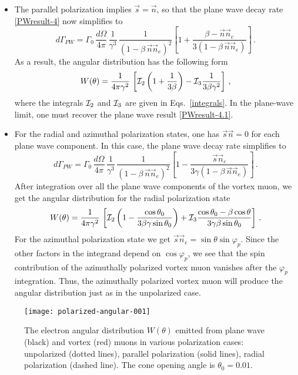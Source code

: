\documentclass[aps,prd,longbibliography,nofootinbib,amsthm,amsmath,amssymb,amsfonts,notitlepage]{revtex4-1}
\begin{document}
\begin{itemize}
	\item
	The parallel polarization implies $\vec s = \vec n$, so that the plane wave decay rate \eqref{PWresult-4} now simplifies to
	\begin{equation}
	d\Gamma_{PW} = \Gamma_0\, \frac{d\Omega}{4\pi} \, \frac{1}{\gamma^3}\, \frac{1}{(1-\beta\, \vec n\vec n_e)^2}
	\left[1 + \frac{\beta - \vec n \vec n_e}{3(1-\beta\, \vec n\vec n_e)}\right]\,.
	\label{PWresult-5.1}
	\end{equation}
	As a result, the angular distribution has the following form
	\begin{equation}
	W(\theta) = \frac{1}{4\pi \gamma^2}\, \left[{\cal I}_2 \left(1 + \frac{1}{3\beta}\right)
	- {\cal I}_3 \frac{1}{3\beta\gamma^2}\right]\,,\label{vortex-result-3}
	\end{equation}
	where the integrals ${\cal I}_2$ and ${\cal I}_3$ are given in Eqs.~\eqref{integrals}.
	In the plane-wave limit, one must recover the plane wave result \eqref{PWresult-4.1}.
	\item
	For the radial and azimuthal polarization states, one has $\vec s \vec n = 0$ for each plane wave component.
	In this case, the plane wave decay rate simplifies to
	\begin{equation}
	d\Gamma_{PW} = \Gamma_0\, \frac{d\Omega}{4\pi} \, \frac{1}{\gamma^3}\, \frac{1}{(1-\beta\, \vec n\vec n_e)^2}
	\left[1 - \frac{\vec s \vec n_e}{3\gamma (1-\beta\, \vec n\vec n_e)}\right]\,.
	\label{PWresult-5.2}
	\end{equation}
	After integration over all the plane wave components of the vortex muon,
	we get the angular distribution for the radial polarization state
	\begin{equation}
	W(\theta) = \frac{1}{4\pi \gamma^2}\, \left[{\cal I}_2 \left(1 - \frac{\cos\theta_0}{3\beta\gamma \sin\theta_0}\right)
	+ {\cal I}_3 \frac{\cos\theta_0 - \beta \cos\theta}{3\gamma\beta\sin\theta_0}\right]\,.\label{vortex-result-4}
	\end{equation}
	For the azimuthal polarization state we get $\vec s \vec n_e = \sin\theta \sin \varphi_p$.
	Since the other factors in the integrand depend on $\cos\varphi_p$, we see that the spin contribution
	of the azimuthally polarized vortex muon vanishes after the $\varphi_p$ integration.
	Thus, the azimuthally polarized vortex muon will produce the angular distribution just as in the unpolarized case.
\end{itemize}

\begin{figure}[!h]
	\centering
	\texttt{[image: polarized-angular-001]}
	\caption{The electron angular distribution $W(\theta)$ emitted from plane wave (black) and vortex (red) muons in various polarization cases:
		unpolarized (dotted lines), parallel polarization (solid lines), radial polarization (dashed line).
		The cone opening angle is $\theta_0 = 0.01$.}\label{Fig-angular-polarized}
\end{figure}
\end{document}
